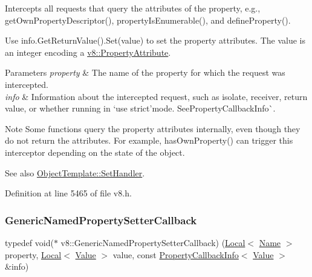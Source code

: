 Intercepts all requests that query the attributes of the property, e.\+g., get\+Own\+Property\+Descriptor(), property\+Is\+Enumerable(), and define\+Property().

Use {\ttfamily info.\+Get\+Return\+Value().Set(value)} to set the property attributes. The value is an integer encoding a {\ttfamily \mbox{\hyperlink{namespacev8_a05f25f935e108a1ea2d150e274602b87}{v8\+::\+Property\+Attribute}}}.


\begin{DoxyParams}{Parameters}
{\em property} & The name of the property for which the request was intercepted. \\
\hline
{\em info} & Information about the intercepted request, such as isolate, receiver, return value, or whether running in `\textquotesingle{}use strict'{\ttfamily mode. See}Property\+Callback\+Info\`{}.\\
\hline
\end{DoxyParams}
\begin{DoxyNote}{Note}
Some functions query the property attributes internally, even though they do not return the attributes. For example, {\ttfamily has\+Own\+Property()} can trigger this interceptor depending on the state of the object.
\end{DoxyNote}
See also {\ttfamily \mbox{\hyperlink{classv8_1_1ObjectTemplate_a3d5666f1e9b0f46df6b4dbb7cfbb6114}{Object\+Template\+::\+Set\+Handler}}.} 

Definition at line 5465 of file v8.\+h.

\mbox{\label{namespacev8_af74716c6e95a269c6cd4314662fd0a7e}} 
\subsubsection{\texorpdfstring{Generic\+Named\+Property\+Setter\+Callback}{GenericNamedPropertySetterCallback}}
{\footnotesize\ttfamily typedef void($\ast$ v8\+::\+Generic\+Named\+Property\+Setter\+Callback) (\mbox{\hyperlink{classv8_1_1Local}{Local}}$<$ \mbox{\hyperlink{classv8_1_1Name}{Name}} $>$ property, \mbox{\hyperlink{classv8_1_1Local}{Local}}$<$ \mbox{\hyperlink{classv8_1_1Value}{Value}} $>$ value, const \mbox{\hyperlink{classv8_1_1PropertyCallbackInfo}{Property\+Callback\+Info}}$<$ \mbox{\hyperlink{classv8_1_1Value}{Value}} $>$ \&info)}


